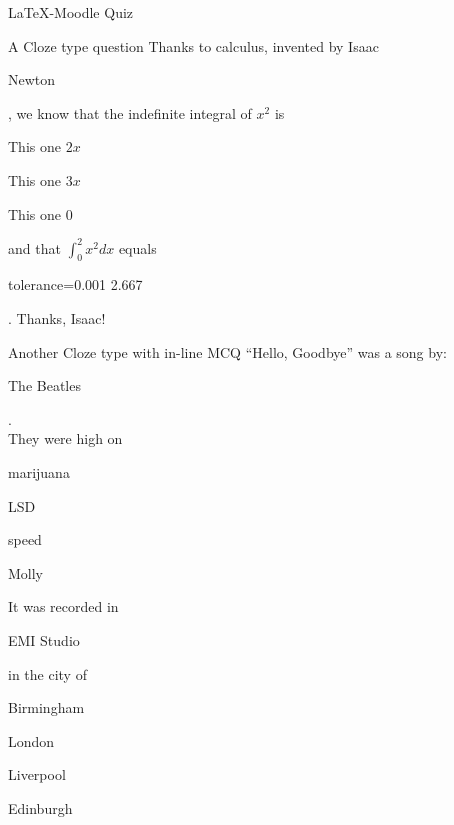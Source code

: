 \documentclass{article}
\begin{document}
\begin{quiz}{LaTeX-Moodle Quiz}
    
    \begin{cloze}{A Cloze type question}
        Thanks to calculus, invented by Isaac
        \begin{shortanswer}[usecase]
            \item Newton
        \end{shortanswer},
        we know that the indefinite integral of $x^2$ is
        \begin{multi}[horizontal]
            \item This one $2x$
            \item* This one $3x$
            \item This one $0$
        \end{multi}
        and that $\int_0^2 x^2 dx$ equals
        \begin{numerical}
            \item[tolerance={0.001}] 2.667
        \end{numerical}.
        Thanks, Isaac!
    \end{cloze}

    \begin{cloze}{Another Cloze type with in-line MCQ}
        ``Hello, Goodbye'' was a song by:
        \begin{shortanswer}[usecase]
            \item The Beatles
        \end{shortanswer}.
        \\
        They were high on
        \begin{multi}[horizontal]
            \item marijuana
            \item* LSD
            \item speed
            \item Molly
        \end{multi}
        It was recorded in
        \begin{shortanswer}[usecase]
            \item EMI Studio
        \end{shortanswer}
        in the city of
        \begin{multi}[vertical]
            \item Birmingham
            \item* London
            \item Liverpool
            \item Edinburgh
        \end{multi}
    \end{cloze}


\end{quiz}
\end{document}
